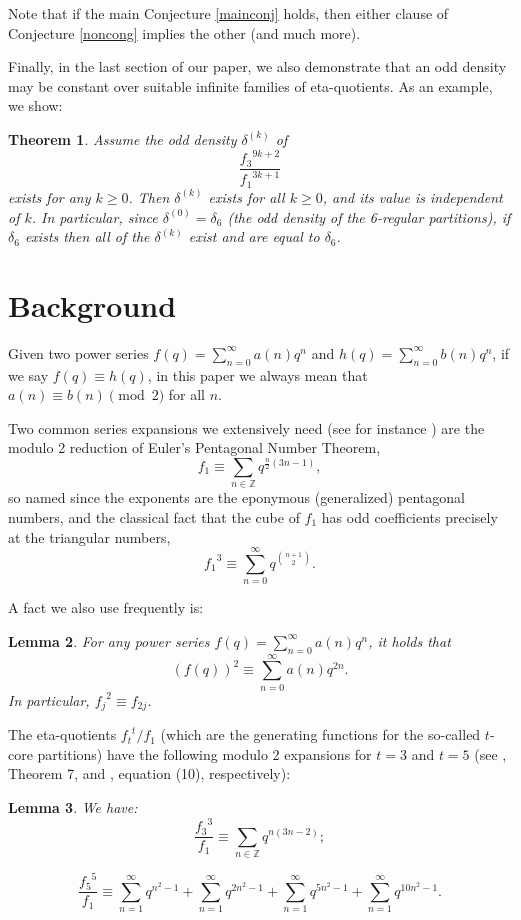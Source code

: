 \documentclass[12pt]{amsart}
\newtheorem{theorem}{Theorem}%
\newtheorem{lemma}[theorem]{Lemma}
\theoremstyle{definition}
\begin{document}
Note that if the main Conjecture \ref{mainconj} holds, then either clause of Conjecture \ref{noncong} implies the other (and much more).

Finally, in the last section of our paper, we also demonstrate that an odd density may be constant over suitable infinite families of eta-quotients. As an example, we show:
\begin{theorem}\label{b6thm} Assume the odd density $\delta^{(k)}$ of $$\frac{{f_3}^{9k+2}}{{f_1}^{3k+1}}$$ exists for \emph{any} $k \geq 0$. Then $\delta^{(k)}$ exists for \emph{all} $k \geq 0$, and its value is independent of $k$.  In particular, since $\delta^{(0)} = \delta_6$ (the odd density of the 6-regular partitions), if $\delta_6$ exists then all of the $\delta^{(k)}$ exist and are equal to $\delta_6$. 
\end{theorem}

\section{Background}\label{back}

Given two power series $f(q) = \sum_{n=0}^\infty a(n) q^n$ and $h(q) = \sum_{n=0}^\infty b(n) q^n$, if we say $f(q) \equiv h(q)$, in this paper we always mean that $a(n) \equiv b(n) \pmod{2}$ for all $n$.

Two common series expansions we extensively need (see for instance \cite{Andr}) are the modulo 2 reduction of Euler's Pentagonal Number Theorem, $$f_1 \equiv \sum_{n \in \mathbb{Z}} q^{\frac{n}{2}(3n-1)},$$ \noindent so named since the exponents are the eponymous (generalized) pentagonal numbers, and the classical fact that the cube of $f_1$ has odd coefficients precisely at the triangular numbers, $${f_1}^3 \equiv \sum_{n=0}^\infty q^{\binom{n+1}{2}}.$$

A fact we also use frequently is:
\begin{lemma}\label{222} For any power series $f(q) = \sum_{n=0}^\infty a(n) q^n$, it holds that $$(f(q))^2 \equiv \sum_{n=0}^\infty a(n) q^{2n}.$$
In particular, ${f_j}^2 \equiv f_{2j}$.
\end{lemma}

The eta-quotients ${f_t}^t / f_1$ (which are the generating functions for the so-called $t$-core partitions) have the following modulo 2 expansions for $t=3$ and $t=5$ (see \cite{Robbins}, Theorem 7, and \cite{Hirsch}, equation (10), respectively):
\begin{lemma}\label{corelemma} We have:
\begin{equation}\label{threecore} \frac{{f_3}^3}{f_1} \equiv \sum_{n \in \mathbb{Z}} q^{n(3n-2)};
\end{equation}

\begin{equation}\label{fivecore}
\frac{{f_5}^5}{f_1} \equiv \sum_{n=1}^\infty q^{n^2-1} + \sum_{n=1}^\infty q^{2n^2-1} + \sum_{n=1}^\infty q^{5n^2-1} + \sum_{n=1}^\infty q^{10n^2-1} .
\end{equation}
\end{lemma}
\end{document}
